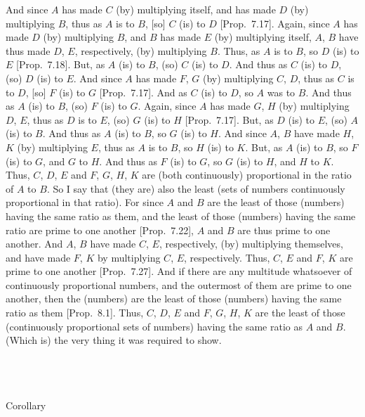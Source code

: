 And since $A$ has made $C$ (by) multiplying itself, and has made $D$ (by)
multiplying $B$, thus as $A$ is to $B$, [so] $C$ (is) to $D$ [Prop.~7.17]. Again, since $A$ has made $D$
(by) multiplying $B$, and $B$ has made $E$ (by) multiplying itself,
 $A$, $B$ have thus made  $D$, $E$, respectively, (by)
multiplying $B$.  Thus, as $A$ is to $B$, so $D$ (is) to $E$ [Prop.~7.18]. But, as $A$ (is) to $B$, (so)
$C$ (is) to $D$. And thus as $C$ (is) to $D$, (so) $D$ (is) to $E$.
And since $A$ has made $F$, $G$ (by) multiplying $C$, $D$, thus as $C$ is to $D$, [so] $F$ (is) to $G$ [Prop.~7.17]. And as $C$ (is) to $D$, so
$A$ was to $B$. And thus as $A$ (is) to $B$, (so) $F$ (is) to $G$. Again,
since $A$ has made $G$, $H$ (by) multiplying $D$, $E$, thus as $D$ is to $E$, (so) $G$ (is) to $H$ [Prop.~7.17]. But, as $D$ (is) to $E$, (so) $A$ (is)
to $B$.  And thus as $A$ (is) to $B$, so $G$ (is) to $H$. And since
$A$, $B$ have made $H$, $K$ (by) multiplying
$E$, thus as $A$ is to $B$, so $H$ (is) to $K$. But, as $A$ (is) to $B$, so
$F$ (is) to $G$, and $G$ to $H$.  And thus as $F$ (is) to $G$, so $G$ (is)
to $H$, and $H$ to $K$. Thus, $C$, $D$, $E$ and $F$, $G$, $H$, $K$
are (both continuously) proportional in the ratio of $A$ to $B$. So I
say that (they are) also the least (sets of numbers continuously proportional in that
ratio). For since $A$ and $B$ are the least of those (numbers) having the
same ratio as them, and the least of those (numbers) having the same
ratio are prime to one another [Prop.~7.22],
$A$ and $B$ are thus prime to one another. And  $A$, $B$
have  made  $C$, $E$, respectively, (by) multiplying themselves, and have made $F$, $K$ by multiplying $C$, $E$, respectively. Thus,
$C$, $E$ and $F$, $K$ are prime to one another [Prop.~7.27]. And if there are any multitude whatsoever of continuously  proportional numbers, and the outermost
of them are prime to one another,  then the (numbers)  are the least of those
(numbers) having the same ratio as them [Prop.~8.1].
Thus, $C$, $D$, $E$ and $F$, $G$, $H$, $K$ are the least of those
(continuously proportional sets of numbers) having the same ratio as $A$ and $B$. (Which is) the very thing it was required to show.\\~\\~\\~\\

\begin{center}
{\large Corollary}
\end{center}\vspace*{-7pt}

